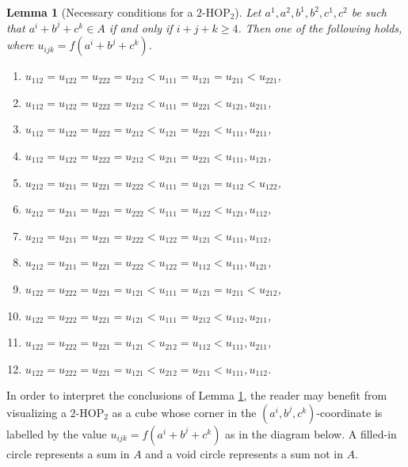 \documentclass[12pt,oneside,british,a4wide]{amsart}
\newtheorem{lemma}[theorem]{Lemma}
\numberwithin{equation}{section}
\theoremstyle{definition}
\def\HOP{\mathrm{HOP}}
\begin{document}
\begin{lemma}[Necessary conditions for a $2$-$\HOP_2$]\label{lem:2hop}
Let $a^1,a^2,b^1,b^2,c^1,c^2$ be such that $a^i+b^j+c^k\in A$ if and only if $i+j+k\geq 4$.  Then one of the following holds, where $u_{ijk}=f(a^i+b^j+c^k)$. 
\begin{enumerate}[label=\normalfont(\arabic*)]
\item $u_{112}=u_{122}=u_{222}=u_{212}<u_{111}=u_{121}=u_{211}<u_{221}$,
\item $u_{112}=u_{122}=u_{222}=u_{212}<u_{111}=u_{221}<u_{121}, u_{211}$,
\item $u_{112}=u_{122}=u_{222}=u_{212}<u_{121}=u_{221}<u_{111}, u_{211}$,
\item $u_{112}=u_{122}=u_{222}=u_{212}<u_{211}=u_{221}<u_{111}, u_{121}$,

\item $u_{212}=u_{211}=u_{221}=u_{222}<u_{111}=u_{121}=u_{112}<u_{122}$,
\item $u_{212}=u_{211}=u_{221}=u_{222}<u_{111}=u_{122}<u_{121}, u_{112}$,
\item $u_{212}=u_{211}=u_{221}=u_{222}<u_{122}=u_{121}<u_{111}, u_{112}$,
\item $u_{212}=u_{211}=u_{221}=u_{222}<u_{122}=u_{112}<u_{111}, u_{121}$,

\item $u_{122}=u_{222}=u_{221}=u_{121}<u_{111}=u_{121}=u_{211}<u_{212}$,
\item $u_{122}=u_{222}=u_{221}=u_{121}<u_{111}=u_{212}<u_{112}, u_{211}$,
\item $u_{122}=u_{222}=u_{221}=u_{121}<u_{212}=u_{112}<u_{111}, u_{211}$,
\item $u_{122}=u_{222}=u_{221}=u_{121}<u_{212}=u_{211}<u_{111}, u_{112}$.
\end{enumerate}
\end{lemma}

In order to interpret the conclusions of Lemma \ref{lem:2hop}, the reader may benefit from visualizing a $2$-$\HOP_2$ as a cube whose corner in the $(a^i, b^j,c^k)$-coordinate is labelled by the value $u_{ijk}=f(a^i+b^j+c^k)$ as in the diagram below. A filled-in circle represents a sum in $A$ and a void circle represents a sum not in $A$.
 
\end{document}
